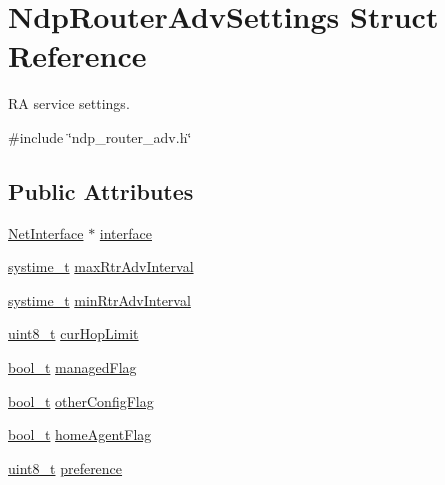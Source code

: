 \hypertarget{structNdpRouterAdvSettings}{}\section{Ndp\+Router\+Adv\+Settings Struct Reference}
\label{structNdpRouterAdvSettings}


RA service settings.  




{\ttfamily \#include \char`\"{}ndp\+\_\+router\+\_\+adv.\+h\char`\"{}}

\subsection*{Public Attributes}
\begin{DoxyCompactItemize}
\item 
\hyperlink{net_8h_a2234db8911a1148c9159979d8f5e0d6b}{Net\+Interface} $\ast$ \hyperlink{structNdpRouterAdvSettings_a17c7ee774c3b7353b2cd578b143cd292}{interface}
\item 
\hyperlink{compiler__port_8h_ae3e32a98d431a02106616da3071832dd}{systime\+\_\+t} \hyperlink{structNdpRouterAdvSettings_ad3c7916d2d18ea5adb8dc9d4b20f20cd}{max\+Rtr\+Adv\+Interval}
\item 
\hyperlink{compiler__port_8h_ae3e32a98d431a02106616da3071832dd}{systime\+\_\+t} \hyperlink{structNdpRouterAdvSettings_af7a8f0941a50dcf68e3139976e007410}{min\+Rtr\+Adv\+Interval}
\item 
\hyperlink{stdint_8h_aba7bc1797add20fe3efdf37ced1182c5}{uint8\+\_\+t} \hyperlink{structNdpRouterAdvSettings_a779ad67d06dd54657953fad2d16c532d}{cur\+Hop\+Limit}
\item 
\hyperlink{compiler__port_8h_a812d16e5494522586b3784e55d479912}{bool\+\_\+t} \hyperlink{structNdpRouterAdvSettings_a79b155a3fd368f238c647d89bc9fff98}{managed\+Flag}
\item 
\hyperlink{compiler__port_8h_a812d16e5494522586b3784e55d479912}{bool\+\_\+t} \hyperlink{structNdpRouterAdvSettings_a49f7625172ab30797afc3a3034a24c0f}{other\+Config\+Flag}
\item 
\hyperlink{compiler__port_8h_a812d16e5494522586b3784e55d479912}{bool\+\_\+t} \hyperlink{structNdpRouterAdvSettings_a4c750f98ddf0e1cac2208d27fcf1f02d}{home\+Agent\+Flag}
\item 
\hyperlink{stdint_8h_aba7bc1797add20fe3efdf37ced1182c5}{uint8\+\_\+t} \hyperlink{structNdpRouterAdvSettings_a2780137e43743780e822c13c794d0227}{preference}
\item 

\end{DoxyCompactItemize}
